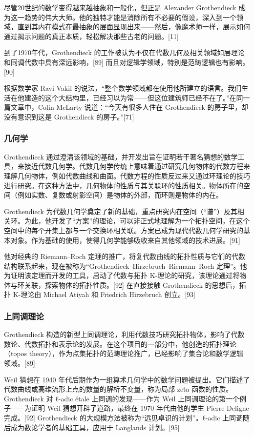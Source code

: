 尽管20世纪的数学变得越来越抽象和一般化，但正是 Alexander Grothendieck 成为这一趋势的伟大大师。他的独特才能是消除所有不必要的假设，深入到一个领域，直到其内在模式在最抽象的层面显现出来——然后，像魔术师一样，展示如何通过揭示问题的真正本质，轻松解决那些古老的问题。[11]

到了1970年代，Grothendieck 的工作被认为不仅在代数几何及相关领域如层理论和同调代数中具有深远影响，[89] 而且对逻辑学领域，特别是范畴逻辑也有影响。[90]

根据数学家 Ravi Vakil 的说法，“整个数学领域都在使用他所建立的语言。我们生活在他建造的这个大结构里，已经习以为常——但这位建筑师已经不在了。”在同一篇文章中，Colin McLarty 说道：“今天有很多人住在 Grothendieck 的房子里，却没有意识到这是 Grothendieck 的房子。”[71]
\subsubsection{几何学}  
Grothendieck 通过澄清该领域的基础，并开发出旨在证明若干著名猜想的数学工具，来接近代数几何学。代数几何学传统上意味着通过研究几何物体的代数方程来理解几何物体，例如代数曲线和曲面。代数方程的性质反过来又通过环理论的技巧进行研究。在这种方法中，几何物体的性质与其关联环的性质相关。物体所在的空间（例如实数、复数或射影空间）是物体的外部，而环则是物体的内在。

Grothendieck 为代数几何学奠定了新的基础，重点研究内在空间（“谱”）及其相关环。为此，他开发了“方案”的理论，可以非正式地理解为一个拓扑空间，在这个空间中的每个开集上都与一个交换环相关联。方案已成为现代代数几何学研究的基本对象。作为基础的使用，使得几何学能够吸收来自其他领域的技术进展。[91]

他对经典的 Riemann–Roch 定理的推广，将复代数曲线的拓扑性质与它们的代数结构联系起来，现在被称为“Grothendieck–Hirzebruch–Riemann–Roch 定理”。他为证明该定理而开发的工具，启动了代数与拓扑 K-理论的研究，该理论通过将物体与环关联，探索物体的拓扑性质。[92] 在直接接触 Grothendieck 的思想后，拓扑 K-理论由 Michael Atiyah 和 Friedrich Hirzebruch 创立。[93]
\subsubsection{上同调理论}  
Grothendieck 构造的新型上同调理论，利用代数技巧研究拓扑物体，影响了代数数论、代数拓扑和表示论的发展。在这个项目的一部分中，他创造的拓扑理论（topos theory），作为点集拓扑的范畴理论推广，已经影响了集合论和数学逻辑领域。[89]

Weil 猜想在 1940 年代后期作为一组算术几何学中的数学问题被提出。它们描述了代数曲线或高维流形上点的数量的解析不变量，称为局部 zeta 函数的性质。Grothendieck 对 ℓ-adic étale 上同调的发现——作为 Weil 上同调理论的第一个例子——为证明 Weil 猜想开辟了道路，最终在 1970 年代由他的学生 Pierre Deligne 完成。[92] Grothendieck 的大规模方法被称为“远见卓识的计划”。ℓ-adic 上同调随后成为数论学者的基础工具，应用于 Langlands 计划。[95]

